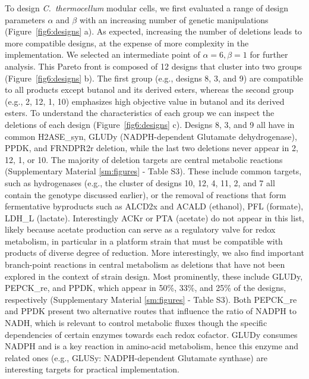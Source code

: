 To design \textit{C.~thermocellum} modular cells, we first evaluated a range of design parameters $\alpha$ and $\beta$ with an increasing number of genetic manipulations (Figure~\ref{fig6:designs} a).
As expected, increasing the number of deletions leads to more compatible designs, at the expense of more complexity in the implementation.
We selected an intermediate point of $\alpha=6, \beta=1$ for further analysis.
This Pareto front is composed of 12 designs that cluster into two groups (Figure~\ref{fig6:designs} b).
The first group (e.g., designs 8, 3, and 9) are compatible to all products except butanol and its derived esters, whereas the second group (e.g., 2, 12, 1, 10) emphasizes high objective value in butanol and its derived esters.
To understand the characteristics of each group we can inspect the deletions of each design (Figure~\ref{fig6:designs} c).
Designs 8, 3, and 9 all have in common H2ASE\_syn, GLUDy (NADPH-dependent Glutamate dehydrogenase), PPDK, and FRNDPR2r deletion, while the last two deletions never appear in 2, 12, 1, or 10. %
The majority of deletion targets are central metabolic reactions (Supplementary Material \ref{sm:figures} - Table S3).
These include common targets, such as hydrogenases (e.g., the cluster of designs 10, 12, 4, 11, 2, and 7 all contain the  genotype discussed earlier), or the removal of reactions that form fermentative byproducts such as ALCD2x and ACALD (ethanol), PFL (formate), LDH\_L (lactate).
Interestingly ACKr or PTA (acetate) do not appear in this list, likely because acetate production can serve as a regulatory valve for redox metabolism, in particular in a platform strain that must be compatible with products of diverse degree of reduction.
More interestingly, we also find important branch-point reactions\citep{stephanopoulos1991} in central metabolism as deletions that have not been explored in the context of strain design.
Most prominently, these include GLUDy, PEPCK\_re, and PPDK, which appear in 50\%, 33\%, and 25\% of the designs, respectively
(Supplementary Material \ref{sm:figures} - Table S3).
Both PEPCK\_re and PPDK present two alternative routes that influence the ratio of NADPH to NADH, which is relevant to control metabolic fluxes though the specific dependencies of certain enzymes towards each redox cofactor.
GLUDy consumes NADPH and is a key reaction in amino-acid metabolism, hence this enzyme and related ones (e.g., GLUSy: NADPH-dependent Glutamate synthase) are interesting targets for practical implementation.

